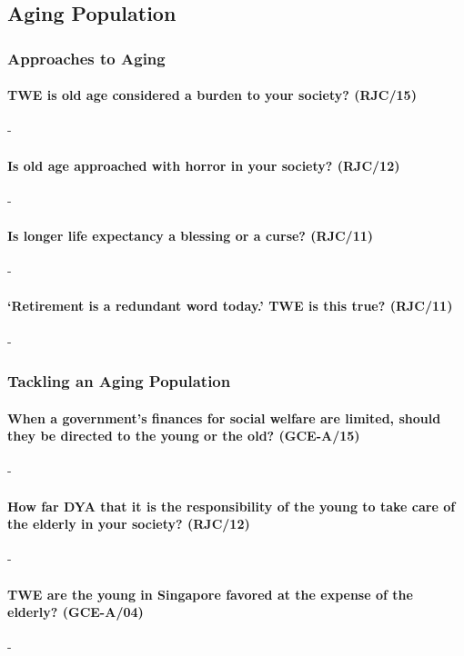 \documentclass[../../main]{subfiles}
\begin{document}
\subsection{Aging Population}

\subsubsection{Approaches to Aging}

\paragraph{TWE is old age considered a burden to your society? (RJC/15)}-

\paragraph{Is old age approached with horror in your society? (RJC/12)}-

\paragraph{Is longer life expectancy a blessing or a curse? (RJC/11)}-

\paragraph{`Retirement is a redundant word today.' TWE is this true? (RJC/11)}-

\subsubsection{Tackling an Aging Population}

\paragraph{When a government's finances for social welfare are limited, should they be directed to the young or the old? (GCE-A/15)}-

\paragraph{How far DYA that it is the responsibility of the young to take care of the elderly in your society? (RJC/12)}-

\paragraph{TWE are the young in Singapore favored at the expense of the elderly? (GCE-A/04)}-
\end{document}
